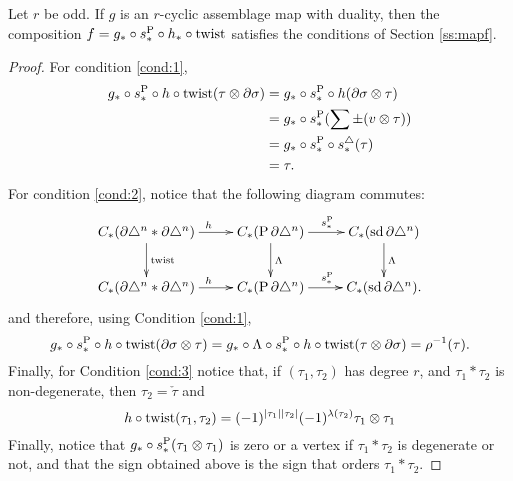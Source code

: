 \begin{proposition} Let $r$ be odd.
    If $g$ is an $r$-cyclic assemblage map with duality, then the composition $f = g_*\circ s_*^{\operatorname{P}}\circ h_*\circ \mathrm{twist}$ satisfies the conditions of Section \ref{ss:mapf}.
\end{proposition}
\begin{proof}
For condition \ref{cond:1},
\begin{align*}
g_*\circ s_*^{\operatorname{P}}\circ h \circ \mathrm{twist}(\tau\otimes \partial\sigma)
&= g_*\circ s_*^{\operatorname{P}}\circ h (\partial\sigma\otimes \tau)\\ 
&= g_*\circ s_*^{\operatorname{P}}(\sum \pm (v\otimes\tau)) \\
&= g_*\circ s_*^{\operatorname{P}}\circ s_*^{\triangle}(\tau) \\
&= \tau.
\end{align*}
For condition \ref{cond:2}, notice that the following diagram commutes:
\[\xymatrix{
C_*(\partial \simplex^n*\partial\simplex^n)\ar[r]^h\ar[d]^{\text{twist}} &C_*(\Psd \partial \simplex^n) \ar[r]^{s_*^{\Psd}}\ar[d]^{\alex}& C_*(\sd \partial \simplex^n)\ar[d]^{\alex}\\
C_*(\partial \simplex^n*\partial\simplex^n)\ar[r]^h &C_*(\Psd \partial \simplex^n) \ar[r]^{s_*^{\Psd}}& C_*(\sd \partial \simplex^n).
}\]
and therefore, using Condition \eqref{cond:1},
\[
g_*\circ s_*^{\operatorname{P}}\circ h \circ \mathrm{twist}(\partial\sigma\otimes \tau) = g_*\circ \Lambda\circ s_*^{\operatorname{P}}\circ h \circ \mathrm{twist}(\tau\otimes \partial\sigma) = \rho^{-1}(\tau).
\]
Finally, for Condition \ref{cond:3} notice that, if $(\tau_1,\tau_2)$ has degree $r$, and $\tau_1*\tau_2$ is non-degenerate, then $\tau_2 = \check{\tau}$ and
\[
h\circ\operatorname{twist}(\tau_1,\tau_2) = (-1)^{|\tau_1||\tau_2|}(-1)^{\lambda(\tau_2)}\tau_1\otimes \tau_1
\]
Finally, notice that $g_*\circ s_*^{\operatorname{P}}(\tau_1\otimes \tau_1)$ is zero or a vertex if $\tau_1*\tau_2$ is degenerate or not, and that the sign obtained above is the sign that orders $\tau_1*\tau_2$.
\end{proof}




